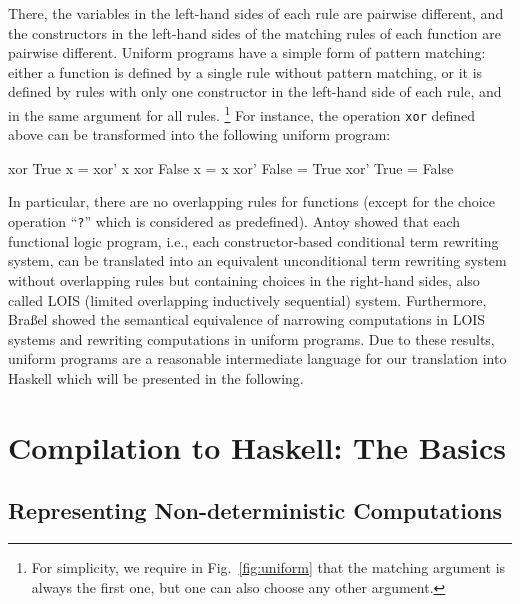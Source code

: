 \documentclass{llncs}
\newcommand{\code}[1]{\mbox{\small\texttt{#1}}}
\newcommand{\ccode}[1]{``\code{#1}''}
\begin{document}
There, the variables in the left-hand sides of each rule are pairwise
different, and
the constructors in the left-hand sides of the matching rules of each function
are pairwise different.
Uniform programs have a simple form of pattern matching:
either a function is defined by a single rule without pattern matching,
or it is defined by rules with only one constructor in the left-hand
side of each rule, and in the same argument for all rules.%
\footnote{For simplicity, we require in
Fig.~\ref{fig:uniform} that the matching argument is always the
first one, but one can also choose any other argument.}
For instance, the operation \code{xor} defined above can be transformed
into the following uniform program:
%
\begin{curry}
  xor True   x = xor' x
  xor False  x = x
  xor' False = True
  xor' True  = False
\end{curry}
%
In particular, there are no overlapping rules for functions
(except for the choice operation \ccode{?} which is considered as predefined).
Antoy \cite{Antoy01PPDP} showed that each functional logic program,
i.e., each constructor-based conditional term rewriting system,
can be translated into an equivalent unconditional term rewriting system
without overlapping rules but containing choices in the right-hand sides,
also called LOIS (limited overlapping inductively sequential) system.
Furthermore, Bra{\ss}el \cite{Brassel11Thesis} showed the semantical
equivalence of narrowing computations in LOIS systems
and rewriting computations in uniform programs.
Due to these results, uniform programs are a reasonable intermediate
language for our translation into Haskell which will be presented
in the following.


\section{Compilation to Haskell: The Basics}
\label{sec:Compilation}

\subsection{Representing Non-deterministic Computations}
\end{document}

